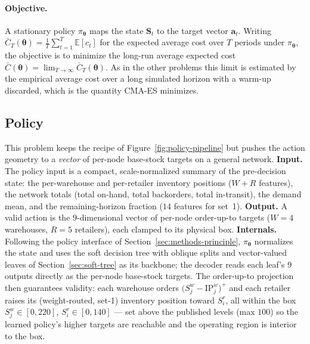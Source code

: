 \documentclass[11pt]{article}
\newcommand{\btheta}{\boldsymbol{\theta}}
\begin{document}
\paragraph{Objective.}
A stationary policy $\pi_{\btheta}$ maps the state $\mathbf S_t$ to the target vector $\mathbf a_t$.
Writing $\bar C_T(\btheta)=\tfrac1T\sum_{t=1}^{T}\mathbb E[c_t]$ for the expected average cost over $T$
periods under $\pi_{\btheta}$, the objective is to minimize the long-run average expected cost
$\bar C(\btheta)=\lim_{T\to\infty}\bar C_T(\btheta)$. As in the other problems this limit is estimated
by the empirical average cost over a long simulated horizon with a warm-up discarded, which is the
quantity CMA-ES minimizes.

\FloatBarrier

\subsection{Policy}
\label{sec:gbk-policy}

This problem keeps the recipe of Figure~\ref{fig:policy-pipeline} but pushes the action geometry to a
\emph{vector} of per-node base-stock targets on a general network. \textbf{Input.} The policy input is
a compact, scale-normalized summary of the pre-decision state: the per-warehouse and per-retailer
inventory positions ($W+R$ features), the network totals (total on-hand, total backorders, total
in-transit), the demand mean, and the remaining-horizon fraction ($14$ features for set~1).
\textbf{Output.} A valid action is the $9$-dimensional vector of per-node order-up-to targets
($W{=}4$ warehouses, $R{=}5$ retailers), each clamped to its physical box. \textbf{Internals.}
Following the policy interface of Section~\ref{sec:methods-principle}, $\pi_{\btheta}$ normalizes the
state and uses the soft decision tree with oblique splits and vector-valued leaves of
Section~\ref{sec:soft-tree} as its backbone; the decoder reads each leaf's $9$ outputs directly as the
per-node base-stock targets. The order-up-to projection then guarantees validity: each warehouse
orders $\big(S^w_{j}-\mathrm{IP}^w_{j}\big)^+$ and each retailer raises its (weight-routed, set-1)
inventory position toward $S^r_{i}$, all within the box $S^w_j\in[0,220]$, $S^r_i\in[0,140]$ --- set
above the published levels (max $100$) so the learned policy's higher targets are reachable and the
operating region is interior to the box.
\end{document}
